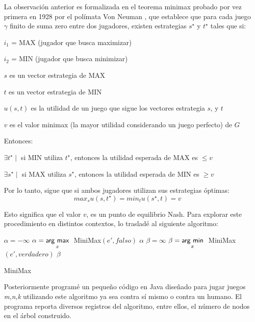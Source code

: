 \clearpage
La observación anterior es formalizada en el teorema minimax probado por vez primera en 1928 por el polímata Von Neuman\autocite[5]{hajiaghayi_28._2011-1} , que establece que para cada juego $\gamma$ finito de suma zero entre dos jugadores, existen estrategias $s^\star$ y $t^\star$ tales que si: 
\begin{enumitem}
\item $i_{1}$ = MAX (jugador que busca maximizar)
\item $i_{2}$ = MIN (jugador que busca minimizar)
\item $s$ es un vector estrategia de MAX
\item $t$ es un vector estrategia de MIN
\item $u(s,t)$ es la utilidad de un juego que sigue los vectores estrategia $s$, y $t$
\item $v$ es el valor minimax (la mayor utilidad considerando un juego perfecto) de $G$
\end{enumitem}

Entonces: 
\begin{enumitem}
\item $\exists t^\star \mid$ si MIN utiliza $t^\star$, entonces la utilidad esperada de MAX es $\leq v$ 
\item $\exists s^\star \mid$ si MAX utiliza $s^\star$, entonces la utilidad esperada de MIN es $\geq v$ 
\end{enumitem}

Por lo tanto, sigue que si ambos jugadores utilizan sus estrategias óptimas:
\begin{equation}
max_{s}u(s,t^\star) = min_{t}u(s^\star,t) = v
\end{equation}

Esto significa que el valor $v$, es un punto de equilibrio Nash\autocite[6]{hajiaghayi_28._2011-1}.
\clearpage
Para explorar este procedimiento en distintos contextos, lo trasladé al siguiente algoritmo\autocite[2]{weibul_game_2011}: 
\begin{algorithm}
\begin{algorithmic}
  \State {}
  \State {}
  \Else
  \State {}
  \EndIf
  \Else
  \State $\alpha = -\infty$
  \State $\alpha = \underset{x}{\operatorname{\mathsf{arg}}\,\operatorname{\mathsf{max}}}\;$ MiniMax$(e', falso)$
  \EndFor
  \State \Return  $\alpha$
  \Else
  \State $\beta = \infty$
  \State $\beta = \underset{x}{\operatorname{\mathsf{arg}}\,\operatorname{\mathsf{min}}}\;$ MiniMax$(e', verdadero)$
  \EndFor
  \State \Return  $\beta$
  \EndIf
  \EndIf
\EndProcedure
\end{algorithmic}
\caption{MiniMax}\label{alg:MiniMax}
\end{algorithm}

Posteriormente programé un pequeño código en Java diseñado para jugar juegos \emph{m,n,k} utilizando este algoritmo ya sea contra sí mismo o contra un humano. El programa reporta diversos registros del algoritmo, entre ellos, el número de nodos en el árbol construido. 

